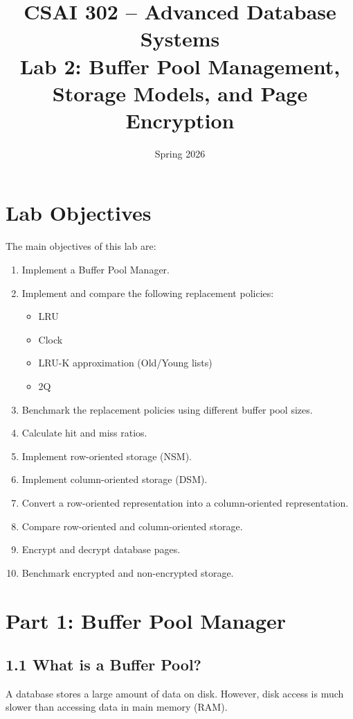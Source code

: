 \documentclass[12pt,a4paper]{article}
\title{
    \textbf{CSAI 302 -- Advanced Database Systems}\\
    \large Lab 2: Buffer Pool Management, Storage Models, and Page Encryption
}
\author{}
\date{Spring 2026}
\begin{document}
\maketitle

\section{Lab Objectives}

The main objectives of this lab are:

\begin{enumerate}
    \item Implement a Buffer Pool Manager.
    \item Implement and compare the following replacement policies:
    \begin{itemize}
        \item LRU
        \item Clock
        \item LRU-K approximation (Old/Young lists)
        \item 2Q
    \end{itemize}
    \item Benchmark the replacement policies using different buffer pool sizes.
    \item Calculate hit and miss ratios.
    \item Implement row-oriented storage (NSM).
    \item Implement column-oriented storage (DSM).
    \item Convert a row-oriented representation into a column-oriented representation.
    \item Compare row-oriented and column-oriented storage.
    \item Encrypt and decrypt database pages.
    \item Benchmark encrypted and non-encrypted storage.
\end{enumerate}

\section{Part 1: Buffer Pool Manager}

\subsection{1.1 What is a Buffer Pool?}

A database stores a large amount of data on disk. However, disk access is much slower than accessing data in main memory (RAM).
\end{document}
